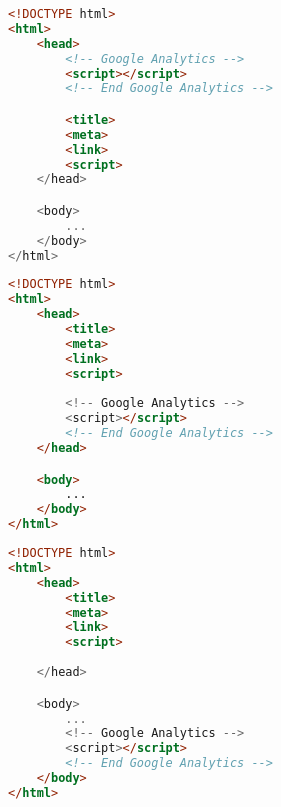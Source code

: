 \begin{sidewaysfigure}

\begin{multicols}{3}

\begin{center}
\begin{lstlisting}[caption={Position 1}, language=html, numbers=none]
<!DOCTYPE html>
<html>
    <head>
        <!-- Google Analytics -->
        <script></script>
        <!-- End Google Analytics -->

        <title>
        <meta>
        <link>
        <script>
    </head>

    <body>
        ...
    </body>
</html>
\end{lstlisting}
\end{center}

\columnbreak

\begin{center}
\begin{lstlisting}[caption={Position 2}, language=html, numbers=none]
<!DOCTYPE html>
<html>
    <head>
        <title>
        <meta>
        <link>
        <script>
        
        <!-- Google Analytics -->
        <script></script>
        <!-- End Google Analytics -->
    </head>

    <body>
        ...
    </body>
</html>
\end{lstlisting}
\end{center}

\columnbreak

\begin{center}
\begin{lstlisting}[caption={Position 3}, language=html, numbers=none]
<!DOCTYPE html>
<html>
    <head>
        <title>
        <meta>
        <link>
        <script>
        
    </head>

    <body>
        ...
        <!-- Google Analytics -->
        <script></script>
        <!-- End Google Analytics -->
    </body>
</html>
\end{lstlisting}
\end{center}

\end{multicols}

\end{sidewaysfigure}






